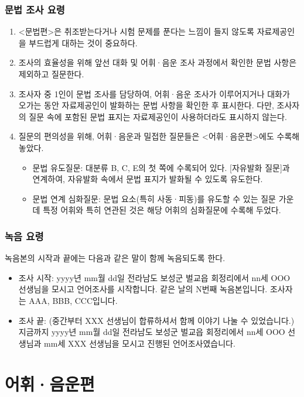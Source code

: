 \documentclass{snu-fl-questionnaire}
\begin{document}
\newpage
\subsection{문법 조사 요령}
\begin{enumerate}[noitemsep]
  \item <문법편>은 취조받는다거나 시험 문제를 푼다는 느낌이 들지 않도록 자료제공인을 부드럽게 대하는 것이 중요하다.
  \item 조사의 효율성을 위해 앞선 대화 및 어휘·음운 조사 과정에서 확인한 문법 사항은 제외하고 질문한다.
  \item 조사자 중 1인이 문법 조사를 담당하여, 어휘·음운 조사가 이루어지거나 대화가 오가는 동안 자료제공인이 발화하는 문법 사항을 확인한 후 표시한다. 다만, 조사자의 질문 속에 포함된 문법 표지는 자료제공인이 사용하더라도 표시하지 않는다.
  \item 질문의 편의성을 위해, 어휘·음운과 밀접한 질문들은 <어휘·음운편>에도 수록해 놓았다.
  \begin{itemize}[noitemsep]
    \item 문법 유도질문: 대분류 B, C, E의 첫 쪽에 수록되어 있다. [자유발화 질문]과 연계하여, 자유발화 속에서 문법 표지가 발화될 수 있도록 유도한다.
    \item 문법 연계 심화질문: 문법 요소(특히 사동·피동)를 유도할 수 있는 질문 가운데 특정 어휘와 특히 연관된 것은 해당 어휘의 심화질문에 수록해 두었다.
  \end{itemize}
\end{enumerate} 

\subsection{녹음 요령}

녹음본의 시작과 끝에는 다음과 같은 말이 함께 녹음되도록 한다.

\begin{itemize}[noitemsep]
  \item 조사 시작: yyyy년 mm월 dd일 전라남도 보성군 벌교읍 회정리에서 nn세 OOO 선생님을 모시고 언어조사를 시작합니다. 같은 날의 N번째 녹음본입니다. 조사자는 AAA, BBB, CCC입니다.
  \item 조사 끝: (중간부터 XXX 선생님이 합류하셔서 함께 이야기 나눌 수 있었습니다.) 지금까지 yyyy년 mm월 dd일 전라남도 보성군 벌교읍 회정리에서 nn세 OOO 선생님과 mm세 XXX 선생님을 모시고 진행된 언어조사였습니다.
\end{itemize}


\mainmatter
\chapter{어휘·음운편}
\end{document}
